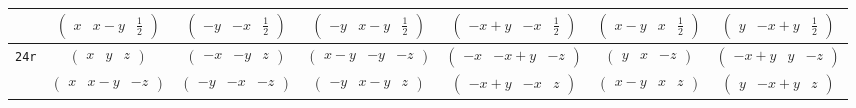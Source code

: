 \documentclass[fleqn,9pt,landscape]{jsarticle}
\begin{document}
\begin{center}
\begin{longtable}{ccccccc}
& $ \begin{pmatrix} x & x - y & \frac{1}{2} \end{pmatrix} $ & $ \begin{pmatrix} - y & - x & \frac{1}{2} \end{pmatrix} $ & $ \begin{pmatrix} - y & x - y & \frac{1}{2} \end{pmatrix} $ & $ \begin{pmatrix} - x + y & - x & \frac{1}{2} \end{pmatrix} $ & $ \begin{pmatrix} x - y & x & \frac{1}{2} \end{pmatrix} $ & $ \begin{pmatrix} y & - x + y & \frac{1}{2} \end{pmatrix} $ \\ \hline
{\tt 24r} & $ \begin{pmatrix} x & y & z \end{pmatrix} $ & $ \begin{pmatrix} - x & - y & z \end{pmatrix} $ & $ \begin{pmatrix} x - y & - y & - z \end{pmatrix} $ & $ \begin{pmatrix} - x & - x + y & - z \end{pmatrix} $ & $ \begin{pmatrix} y & x & - z \end{pmatrix} $ & $ \begin{pmatrix} - x + y & y & - z \end{pmatrix} $ \\
& $ \begin{pmatrix} x & x - y & - z \end{pmatrix} $ & $ \begin{pmatrix} - y & - x & - z \end{pmatrix} $ & $ \begin{pmatrix} - y & x - y & z \end{pmatrix} $ & $ \begin{pmatrix} - x + y & - x & z \end{pmatrix} $ & $ \begin{pmatrix} x - y & x & z \end{pmatrix} $ & $ \begin{pmatrix} y & - x + y & z \end{pmatrix} $ \\

\end{longtable}
\end{center}
\end{document}

